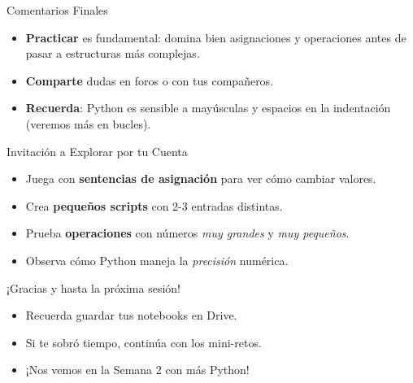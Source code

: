 \documentclass[10pt]{beamer}
\begin{document}
\begin{frame}{Comentarios Finales}
  \begin{itemize}
    \item \textbf{Practicar} es fundamental: domina bien asignaciones y operaciones antes de pasar a estructuras más complejas.
    \item \textbf{Comparte} dudas en foros o con tus compañeros.
    \item \textbf{Recuerda}: Python es sensible a mayúsculas y espacios en la indentación (veremos más en bucles).
  \end{itemize}
\end{frame}

\begin{frame}{Invitación a Explorar por tu Cuenta}
  \begin{itemize}
    \item Juega con \textbf{sentencias de asignación} para ver cómo cambiar valores.
    \item Crea \textbf{pequeños scripts} con 2-3 entradas distintas.
    \item Prueba \textbf{operaciones} con números \emph{muy grandes} y \emph{muy pequeños}.
    \item Observa cómo Python maneja la \textit{precisión} numérica.
  \end{itemize}
\end{frame}

\begin{frame}
  \huge{\centerline{¡Gracias y hasta la próxima sesión!}}
  \vspace{0.4cm}
  \normalsize
  \begin{itemize}
    \item Recuerda guardar tus notebooks en Drive.
    \item Si te sobró tiempo, continúa con los mini-retos.
    \item ¡Nos vemos en la Semana 2 con más Python!
  \end{itemize}
\end{frame}
\end{document}
